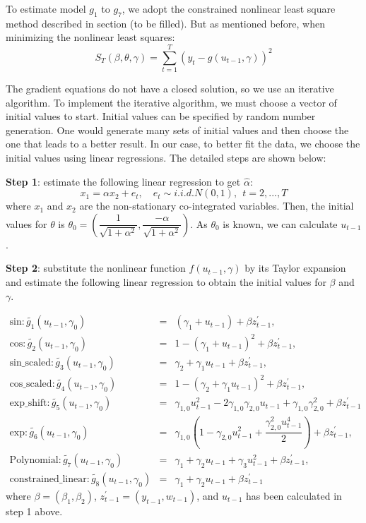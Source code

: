 \documentclass[a4paper,12pt,times,numbered,print,index]{report}
\numberwithin{equation}{section}
\begin{document}
To estimate model $g_1$ to $g_7$, we adopt the constrained nonlinear least square method described in section (to be filled). But as mentioned before, when minimizing the nonlinear least squares:
$$
S_{T}(\beta, \theta, \gamma)=\sum_{t=1}^{T}\left(y_{t}-g\left(u_{t-1}, \gamma\right)\right)^{2}
$$

The gradient equations do not have a closed solution, so we use an iterative algorithm. To implement the iterative algorithm, we must choose a vector of initial values to start. Initial values can be specified by random number generation. One would generate many sets of initial values and then choose the one that leads to a better result. In our case, to better fit the data, we choose the initial values using linear regressions. The detailed steps are shown below:

\textbf{Step 1}: estimate the following linear regression to get $\hat{\alpha}$:
$$
x_1 = \alpha x_2 + e_t, \quad e_{t}\sim i.i.d.N\left( 0,1\right) ,\ \ t=2,...,T
$$
where $x_1$ and $x_2$ are the non-stationary co-integrated variables. 
Then, the initial values for $\theta$ is $\theta_{0} = (\dfrac{1}{\sqrt{1+\alpha^2}}, \dfrac{-\alpha}{\sqrt{1+\alpha^2}})$. 
As $\theta_{0}$ is known, we can calculate $u_{t-1}$.

\textbf{Step 2}: substitute the nonlinear function $f\left( u_{t-1},\gamma \right)$ by its Taylor expansion and estimate the following linear regression to obtain the initial values for $\beta$ and $\gamma$.

\begin{eqnarray*}
	\text{sin}: \tilde{g_{1}}\left( u_{t-1},\gamma _{0}\right) &=& \left( \gamma_{1} + u_{t-1}\right) + \beta z_{t-1}^{\prime},  \\
	\text{cos}: \tilde{g_{2}}\left( u_{t-1},\gamma _{0}\right) &=& 1 - \left( \gamma_{1} + u_{t-1}\right)^2  + \beta z_{t-1}^{\prime}, \\
	\text{sin\_scaled}: \tilde{g_{3}}\left( u_{t-1},\gamma_{0}\right) &=& \gamma_{2}  + \gamma_{1}u_{t-1} + \beta z_{t-1}^{\prime},  \\
	\text{cos\_scaled}: \tilde{g_{4}}\left( u_{t-1},\gamma_{0}\right) &=& 1 - \left( \gamma_{2} + \gamma_{1}u_{t-1}\right)^2  + \beta z_{t-1}^{\prime}, \\
	\text{exp\_shift}: \tilde{g_{5}}\left( u_{t-1}, \gamma_{0}\right) &=&  \gamma_{1,0}u_{t-1}^2 - 2\gamma_{1,0}\gamma_{2,0}u_{t-1} + \gamma_{1,0}\gamma_{2,0}^2 + \beta z_{t-1}^{\prime} \\
	\text{exp}: \tilde{g_{6}}\left( u_{t-1},\gamma _{0}\right) &=&  \gamma_{1,0}(1-\gamma_{2,0}u_{t-1}^2 + \dfrac{\gamma_{2,0}^2 u_{t-1}^4}{2}) + \beta z_{t-1}^{\prime}, \\
	\text{Polynomial}: \tilde{g_{7}}\left( u_{t-1},\gamma_{0}\right) &=& \gamma_{1}+ \gamma_{2}u_{t-1}+\gamma_{3}u_{t-1}^{2}+\beta z_{t-1}^{\prime}, \\
	\text{constrained\_linear}: \tilde{g_{8}}\left( u_{t-1},\gamma_{0}\right) &=& \gamma_{1}+ \gamma_{2}u_{t-1}+\beta z_{t-1}^{\prime}
\end{eqnarray*}%
where $\beta = (\beta_{1}, \beta_{2})$, $ z_{t-1}^{\prime } = (y_{t-1}, w_{t-1})$, and $u_{t-1}$ has been calculated in step 1 above.
\end{document}
